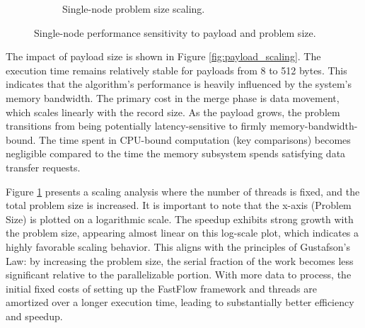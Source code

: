 \documentclass[10pt]{article}
\begin{document}
\begin{figure}[H]
\begin{subfigure}{0.49\textwidth}
        \caption{Single-node problem size scaling.}
        \label{fig:problem_size_scaling}
    \end{subfigure}
    \caption{Single-node performance sensitivity to payload and problem size.}
    \label{fig:single_node_sensitivity}
\end{figure}

The impact of payload size is shown in Figure \ref{fig:payload_scaling}. The execution time remains relatively stable for payloads from 8 to 512 bytes. This indicates that the algorithm's performance is heavily influenced by the system's memory bandwidth. The primary cost in the merge phase is data movement, which scales linearly with the record size. As the payload grows, the problem transitions from being potentially latency-sensitive to firmly memory-bandwidth-bound. The time spent in CPU-bound computation (key comparisons) becomes negligible compared to the time the memory subsystem spends satisfying data transfer requests.

Figure \ref{fig:problem_size_scaling} presents a scaling analysis where the number of threads is fixed, and the total problem size is increased. It is important to note that the x-axis (Problem Size) is plotted on a logarithmic scale. The speedup exhibits strong growth with the problem size, appearing almost linear on this log-scale plot, which indicates a highly favorable scaling behavior. This aligns with the principles of Gustafson's Law: by increasing the problem size, the serial fraction of the work becomes less significant relative to the parallelizable portion. With more data to process, the initial fixed costs of setting up the FastFlow framework and threads are amortized over a longer execution time, leading to substantially better efficiency and speedup.
\end{document}
